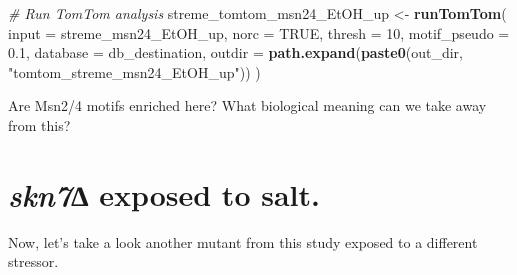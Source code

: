 \documentclass[
]{book}
\newenvironment{Shaded}{\begin{snugshade}}{\end{snugshade}}
\newcommand{\AttributeTok}[1]{\textcolor[rgb]{0.13,0.29,0.53}{#1}}
\newcommand{\CommentTok}[1]{\textcolor[rgb]{0.56,0.35,0.01}{\textit{#1}}}
\newcommand{\ConstantTok}[1]{\textcolor[rgb]{0.56,0.35,0.01}{#1}}
\newcommand{\DecValTok}[1]{\textcolor[rgb]{0.00,0.00,0.81}{#1}}
\newcommand{\FloatTok}[1]{\textcolor[rgb]{0.00,0.00,0.81}{#1}}
\newcommand{\FunctionTok}[1]{\textcolor[rgb]{0.13,0.29,0.53}{\textbf{#1}}}
\newcommand{\NormalTok}[1]{#1}
\newcommand{\OtherTok}[1]{\textcolor[rgb]{0.56,0.35,0.01}{#1}}
\newcommand{\StringTok}[1]{\textcolor[rgb]{0.31,0.60,0.02}{#1}}
\begin{document}
\begin{Shaded}
\begin{Highlighting}[]
\CommentTok{\# Run TomTom analysis}
\NormalTok{streme\_tomtom\_msn24\_EtOH\_up }\OtherTok{\textless{}{-}} \FunctionTok{runTomTom}\NormalTok{(}
  \AttributeTok{input =}\NormalTok{ streme\_msn24\_EtOH\_up,}
  \AttributeTok{norc =} \ConstantTok{TRUE}\NormalTok{,}
  \AttributeTok{thresh =} \DecValTok{10}\NormalTok{,}
  \AttributeTok{motif\_pseudo =} \FloatTok{0.1}\NormalTok{,}
  \AttributeTok{database =}\NormalTok{ db\_destination,}
  \AttributeTok{outdir =} \FunctionTok{path.expand}\NormalTok{(}\FunctionTok{paste0}\NormalTok{(out\_dir, }\StringTok{"tomtom\_streme\_msn24\_EtOH\_up"}\NormalTok{))}
\NormalTok{  )}
\end{Highlighting}
\end{Shaded}

Are Msn2/4 motifs enriched here? What biological meaning can we take
away from this?

\hypertarget{skn7-exposed-to-salt.}{%
\section{\texorpdfstring{\emph{skn7}∆ exposed to salt.}{skn7∆ exposed to salt.}}\label{skn7-exposed-to-salt.}}

Now, let's take a look another mutant from this study exposed to a
different stressor.
\end{document}

